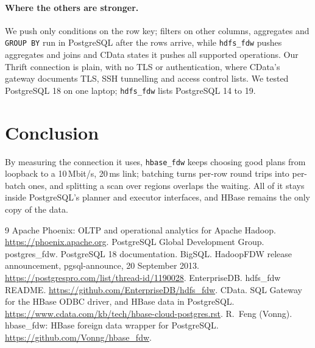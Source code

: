\documentclass[11pt,a4paper]{article}
\newcommand{\code}[1]{\texttt{#1}}
\begin{document}
\paragraph{Where the others are stronger.} We push only conditions on the row key; filters on other columns, aggregates and \code{GROUP BY} run in PostgreSQL after the rows arrive, while \code{hdfs\_fdw} pushes aggregates and joins and CData states it pushes all supported operations. Our Thrift connection is plain, with no TLS or authentication, where CData's gateway documents TLS, SSH tunnelling and access control lists. We tested PostgreSQL 18 on one laptop; \code{hdfs\_fdw} lists PostgreSQL 14 to 19.

\section{Conclusion}
By measuring the connection it uses, \code{hbase\_fdw} keeps choosing good plans from loopback to a 10\,Mbit/s, 20\,ms link; batching turns per-row round trips into per-batch ones, and splitting a scan over regions overlaps the waiting. All of it stays inside PostgreSQL's planner and executor interfaces, and HBase remains the only copy of the data.

\begin{thebibliography}{9}\small
\setlength{\itemsep}{0pt}\setlength{\parsep}{0pt}
 Apache Phoenix: OLTP and operational analytics for Apache Hadoop. \url{https://phoenix.apache.org}.
 PostgreSQL Global Development Group. postgres\_fdw. PostgreSQL 18 documentation.
 BigSQL. HadoopFDW release announcement, pgsql-announce, 20 September 2013. \url{https://postgrespro.com/list/thread-id/1190028}.
 EnterpriseDB. hdfs\_fdw README. \url{https://github.com/EnterpriseDB/hdfs_fdw}.
 CData. SQL Gateway for the HBase ODBC driver, and HBase data in PostgreSQL. \url{https://www.cdata.com/kb/tech/hbase-cloud-postgres.rst}.
 R.~Feng (Vonng). hbase\_fdw: HBase foreign data wrapper for PostgreSQL. \url{https://github.com/Vonng/hbase_fdw}.
\end{thebibliography}
\end{document}
